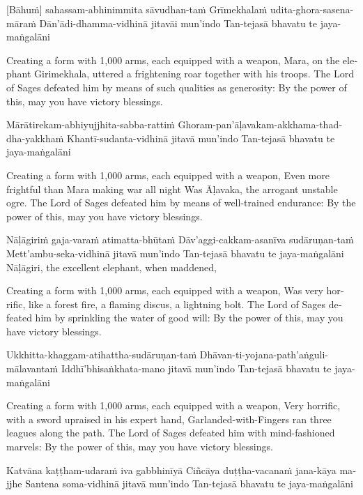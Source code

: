 \begin{english}
\begin{english}
\suttaRef{[MJG]}

[Bāhuṁ] sahassam-abhinimmita sāvudhan-taṁ
Grīmekhalaṁ udita-ghora-sasena-māraṁ
Dān’ādi-dhamma-vidhinā jitavāi mun’indo
Tan-tejasā bhavatu te jaya-maṅgalāni

\begin{english}
Creating a form with 1,000 arms, each equipped with a weapon,
Mara, on the elephant Girimekhala, uttered a frightening roar together with his troops.
The Lord of Sages defeated him by means of such qualities as generosity:
By the power of this, may you have victory blessings.
\end{english}

Mārātirekam-abhiyujjhita-sabba-rattiṁ
Ghoram-pan’āḷavakam-akkhama-thaddha-yakkhaṁ
Khantī-sudanta-vidhinā jitavā mun’indo
Tan-tejasā bhavatu te jaya-maṅgalāni

\begin{english}
Creating a form with 1,000 arms, each equipped with a weapon,
Even more frightful than Mara making war all night
Was Āḷavaka, the arrogant unstable ogre.
The Lord of Sages defeated him by means of well-trained endurance:
By the power of this, may you have victory blessings.
\end{english}

Nāḷāgiriṁ gaja-varaṁ atimatta-bhūtaṁ
Dāv’aggi-cakkam-asanīva sudāruṇan-taṁ
Mett’ambu-seka-vidhinā jitavā mun’indo
Tan-tejasā bhavatu te jaya-maṅgalāni
Nāḷāgiri, the excellent elephant, when maddened,

\begin{english}
Creating a form with 1,000 arms, each equipped with a weapon,
Was very horrific, like a forest fire, a flaming discus, a lightning bolt.
The Lord of Sages defeated him by sprinkling the water of good will:
By the power of this, may you have victory blessings.
\end{english}

Ukkhitta-khaggam-atihattha-sudāruṇan-taṁ
Dhāvan-ti-yojana-path’aṅguli-mālavantaṁ
Iddhī’bhisaṅkhata-mano jitavā mun’indo
Tan-tejasā bhavatu te jaya-maṅgalāni

\begin{english}
Creating a form with 1,000 arms, each equipped with a weapon,
Very horrific, with a sword upraised in his expert hand, Garlanded-with-Fingers ran three leagues along the path.
The Lord of Sages defeated him with mind-fashioned marvels:
By the power of this, may you have victory blessings.
\end{english}

Katvāna kaṭṭham-udaraṁ iva gabbhinīyā
Ciñcāya duṭṭha-vacanaṁ jana-kāya majjhe
Santena soma-vidhinā jitavā mun’indo
Tan-tejasā bhavatu te jaya-maṅgalāni


\end{english}
\end{english}
